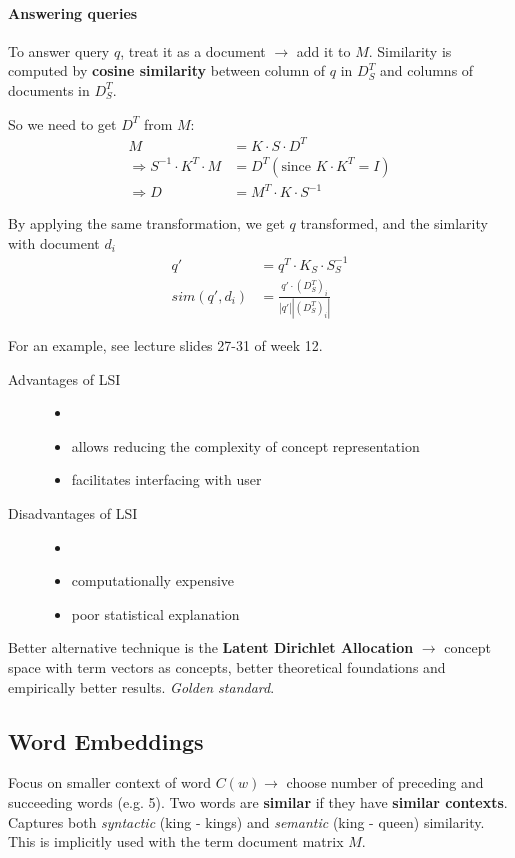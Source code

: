 \paragraph{Answering queries} To answer query $q$, treat it as a document $\longrightarrow$ add it to $M$. Similarity is computed by \textbf{cosine similarity} between column of $q$ in $D_S^T$ and columns of documents in $D_S^T$.

So we need to get $D^T$ from $M$:
\begin{align*}
  M &= K\cdot S \cdot D^T \\
  \Rightarrow S^{-1} \cdot K^T \cdot M &= D^T (\text{since } K \cdot K^T = I) \\
  \Rightarrow D &= M^T \cdot K \cdot S^{-1}
\end{align*}

By applying the same transformation, we get $q$ transformed, and the simlarity with document $d_i$
\begin{align*}
  q' &= q^T \cdot K_S \cdot S_S^{-1} \\
  sim(q', d_i) &= \frac{q' \cdot (D_S^T)_i}{|q'| |(D_S^T)_i|}
\end{align*}

For an example, see lecture slides 27-31 of week 12.

\begin{description}
  \item[Advantages of LSI]
  \begin{itemize}
    \item[]
    \item allows reducing the complexity of concept representation
    \item facilitates interfacing with user
  \end{itemize}
  \item[Disadvantages of LSI]
  \begin{itemize}
    \item[]
    \item computationally expensive
    \item poor statistical explanation
  \end{itemize}
\end{description}

Better alternative technique is the \textbf{Latent Dirichlet Allocation} $\longrightarrow$ concept space with term vectors as concepts, better theoretical foundations and empirically better results. \emph{Golden standard}.

\subsection{Word Embeddings}
Focus on smaller context of word $C(w) \rightarrow$ choose number of preceding and succeeding words (e.g. 5). Two words are \textbf{similar} if they have \textbf{similar contexts}. Captures both \emph{syntactic} (king - kings) and \emph{semantic} (king - queen) similarity. This is implicitly used with the term document matrix $M$.

